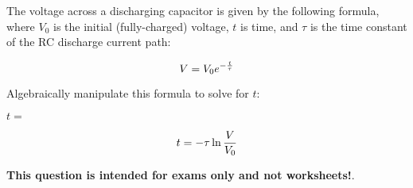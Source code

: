 

The voltage across a discharging capacitor is given by the following formula, where $V_0$ is the initial (fully-charged) voltage, $t$ is time, and $\tau$ is the time constant of the RC discharge current path:
 
$$V = V_0 e^{- {t \over \tau}}$$

Algebraically manipulate this formula to solve for $t$:

\vskip 20pt

$t = $







$$t = -\tau \ln {V \over V_0}$$







{\bf This question is intended for exams only and not worksheets!}.



